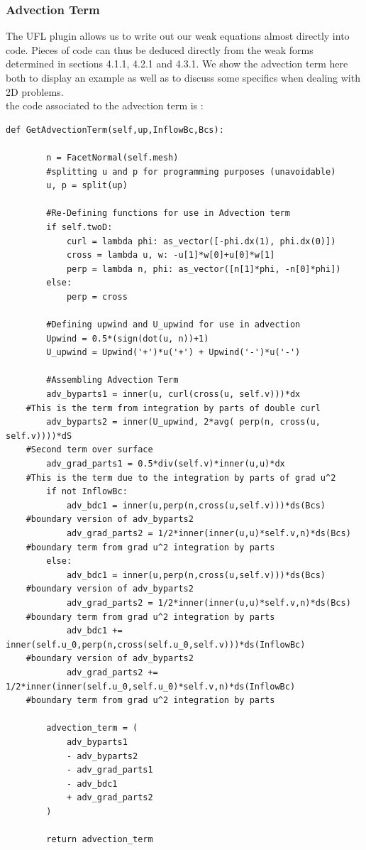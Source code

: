 \documentclass[11pt,twoside,a4paper]{article}
\begin{document}
\subsubsection{Advection Term}
The UFL plugin allows us to write out our weak equations almost directly into code. Pieces of code can thus be deduced directly from the weak forms determined in sections 4.1.1, 4.2.1 and 4.3.1. We show the advection term here both to display an example as well as to discuss some specifics when dealing with 2D problems.\\
the code associated to the advection term is :
\begin{lstlisting}
def GetAdvectionTerm(self,up,InflowBc,Bcs):

        n = FacetNormal(self.mesh)
        #splitting u and p for programming purposes (unavoidable)
        u, p = split(up)

        #Re-Defining functions for use in Advection term
        if self.twoD:
            curl = lambda phi: as_vector([-phi.dx(1), phi.dx(0)])
            cross = lambda u, w: -u[1]*w[0]+u[0]*w[1]
            perp = lambda n, phi: as_vector([n[1]*phi, -n[0]*phi])
        else:
            perp = cross

        #Defining upwind and U_upwind for use in advection
        Upwind = 0.5*(sign(dot(u, n))+1)
        U_upwind = Upwind('+')*u('+') + Upwind('-')*u('-')

        #Assembling Advection Term
        adv_byparts1 = inner(u, curl(cross(u, self.v)))*dx
	#This is the term from integration by parts of double curl
        adv_byparts2 = inner(U_upwind, 2*avg( perp(n, cross(u, self.v))))*dS
	#Second term over surface
        adv_grad_parts1 = 0.5*div(self.v)*inner(u,u)*dx
	#This is the term due to the integration by parts of grad u^2
        if not InflowBc:
            adv_bdc1 = inner(u,perp(n,cross(u,self.v)))*ds(Bcs)
	#boundary version of adv_byparts2
            adv_grad_parts2 = 1/2*inner(inner(u,u)*self.v,n)*ds(Bcs)
	#boundary term from grad u^2 integration by parts
        else:
            adv_bdc1 = inner(u,perp(n,cross(u,self.v)))*ds(Bcs)
	#boundary version of adv_byparts2
            adv_grad_parts2 = 1/2*inner(inner(u,u)*self.v,n)*ds(Bcs)
	#boundary term from grad u^2 integration by parts
            adv_bdc1 +=  inner(self.u_0,perp(n,cross(self.u_0,self.v)))*ds(InflowBc)
	#boundary version of adv_byparts2
            adv_grad_parts2 += 1/2*inner(inner(self.u_0,self.u_0)*self.v,n)*ds(InflowBc)
	#boundary term from grad u^2 integration by parts

        advection_term = (
            adv_byparts1
            - adv_byparts2
            - adv_grad_parts1
            - adv_bdc1
            + adv_grad_parts2
        )

        return advection_term
\end{lstlisting}
\end{document}

